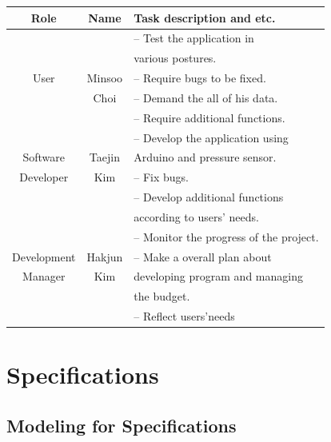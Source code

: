 \documentclass[conference]{IEEEtran}
\begin{document}
\begin{tabular}{|c|c|l|}\hline
Role & Name & Task description and etc.\\ \hline \hline

&  &  -- Test the application in \\ 

&  &  various postures. \\

User & Minsoo & -- Require bugs to be fixed.  \\ 

& Choi & -- Demand the all of his data. \\ 

&  & -- Require additional functions. \\ \hline

&  &  -- Develop the application using\\ 

Software & Taejin & Arduino and pressure sensor. \\ 

Developer & Kim & -- Fix bugs. \\ 

&  & -- Develop additional functions\\ 

&  & according to users' needs. \\ \hline

&  &  -- Monitor the progress of the project. \\ 

Development & Hakjun & -- Make a overall plan about \\ 

Manager& Kim & developing program and managing \\ 

&  & the budget.\\

&  & -- Reflect users'needs \\ \hline

\end{tabular}


\section{Specifications}

\subsection{Modeling for Specifications \\}
\end{document}
